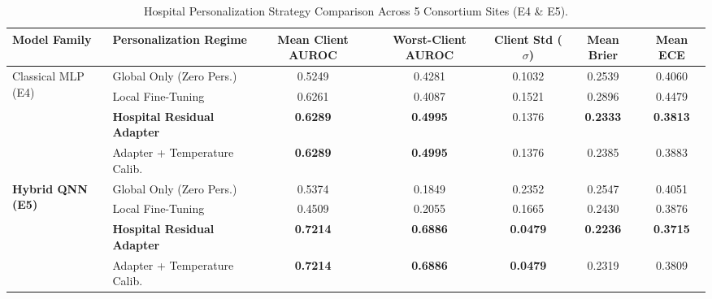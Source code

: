 \documentclass{article}
\begin{document}
\vspace{1em}

\begin{table}[htbp]
\centering
\small
\caption{Hospital Personalization Strategy Comparison Across 5 Consortium Sites (E4 \& E5).}
\label{tab:personalization_results}
\begin{tabular}{llccccc}
\toprule
\textbf{Model Family} & \textbf{Personalization Regime} & \textbf{Mean Client AUROC} & \textbf{Worst-Client AUROC} & \textbf{Client Std ($\sigma$)} & \textbf{Mean Brier} & \textbf{Mean ECE} \\
\midrule
\multirow{4}{*}{Classical MLP (E4)} 
& Global Only (Zero Pers.) & 0.5249 & 0.4281 & 0.1032 & 0.2539 & 0.4060 \\
& Local Fine-Tuning & 0.6261 & 0.4087 & 0.1521 & 0.2896 & 0.4479 \\
& \textbf{Hospital Residual Adapter} & \textbf{0.6289} & \textbf{0.4995} & 0.1376 & \textbf{0.2333} & \textbf{0.3813} \\
& Adapter + Temperature Calib. & \textbf{0.6289} & \textbf{0.4995} & 0.1376 & 0.2385 & 0.3883 \\
\midrule
\multirow{4}{*}{\textbf{Hybrid QNN (E5)}} 
& Global Only (Zero Pers.) & 0.5374 & 0.1849 & 0.2352 & 0.2547 & 0.4051 \\
& Local Fine-Tuning & 0.4509 & 0.2055 & 0.1665 & 0.2430 & 0.3876 \\
& \textbf{Hospital Residual Adapter} & \textbf{0.7214} & \textbf{0.6886} & \textbf{0.0479} & \textbf{0.2236} & \textbf{0.3715} \\
& Adapter + Temperature Calib. & \textbf{0.7214} & \textbf{0.6886} & \textbf{0.0479} & 0.2319 & 0.3809 \\
\bottomrule
\end{tabular}
\end{table}

\vspace{1em}
\end{document}
